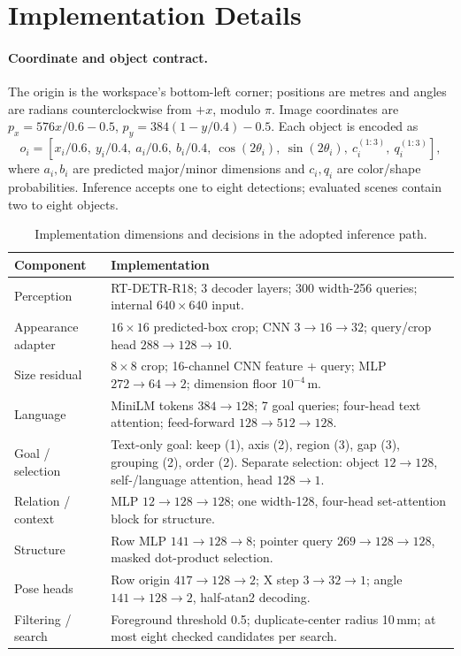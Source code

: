 \section{Implementation Details}
\label{app:implementation}
\paragraph{Coordinate and object contract.}
The origin is the workspace's bottom-left corner; positions are metres and angles are radians counterclockwise from $+x$, modulo $\pi$. Image coordinates are $p_x=576x/0.6-0.5$, $p_y=384(1-y/0.4)-0.5$. Each object is encoded as
\begin{equation}
 o_i=[x_i/0.6,\ y_i/0.4,\ a_i/0.6,\ b_i/0.4,\ \cos(2\theta_i),\ \sin(2\theta_i),\ c_i^{(1:3)},\ q_i^{(1:3)}],
\end{equation}
where $a_i,b_i$ are predicted major/minor dimensions and $c_i,q_i$ are color/shape probabilities. Inference accepts one to eight detections; evaluated scenes contain two to eight objects.

\begin{table}[H]
\centering\small
\caption{Implementation dimensions and decisions in the adopted inference path.}
\begin{tabularx}{\linewidth}{@{}lY@{}}\toprule
\textbf{Component} & \textbf{Implementation} \\\midrule
Perception & RT-DETR-R18; 3 decoder layers; 300 width-256 queries; internal $640\times640$ input. \\
Appearance adapter & $16\times16$ predicted-box crop; CNN $3\to16\to32$; query/crop head $288\to128\to10$. \\
Size residual & $8\times8$ crop; 16-channel CNN feature + query; MLP $272\to64\to2$; dimension floor $10^{-4}$\,m. \\
Language & MiniLM tokens $384\to128$; 7 goal queries; four-head text attention; feed-forward $128\to512\to128$. \\
Goal / selection & Text-only goal: keep (1), axis (2), region (3), gap (3), grouping (2), order (2). Separate selection: object $12\to128$, self-/language attention, head $128\to1$. \\
Relation / context & MLP $12\to128\to128$; one width-128, four-head set-attention block for structure. \\
Structure & Row MLP $141\to128\to8$; pointer query $269\to128\to128$, masked dot-product selection. \\
Pose heads & Row origin $417\to128\to2$; X step $3\to32\to1$; angle $141\to128\to2$, half-atan2 decoding. \\
Filtering / search & Foreground threshold 0.5; duplicate-center radius 10\,mm; at most eight checked candidates per search. \\\bottomrule
\end{tabularx}
\end{table}

